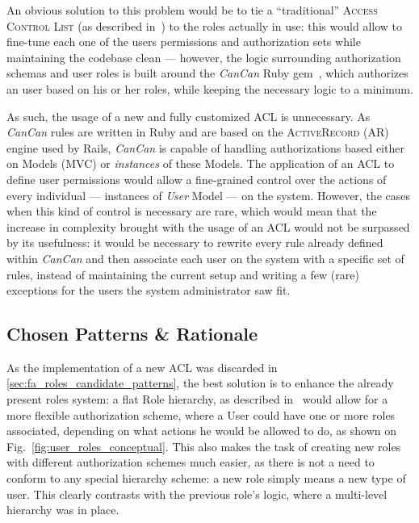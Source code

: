 An obvious solution to this problem would be to tie a ``traditional'' \textsc{Access Control List} (as described in~\cite{acls}) to the roles actually in use: this would allow to fine-tune each one of the users permissions and authorization sets while maintaining the codebase clean --- however, the logic surrounding authorization schemas and user roles is built around the \emph{CanCan} Ruby gem~\cite{cancan}, which authorizes an user based on his or her roles, while keeping the necessary logic to a minimum.

As such, the usage of a new and fully customized ACL is unnecessary. As \emph{CanCan} rules are written in Ruby and are based on the \textsc{ActiveRecord} (AR) engine used by Rails, \emph{CanCan} is capable of handling authorizations based either on Models (MVC) or \emph{instances} of these Models. The application of an ACL to define user permissions would allow a fine-grained control over the actions of every individual --- instances of \emph{User} Model --- on the system. However, the cases when this kind of control is necessary are rare, which would mean that the increase in complexity brought with the usage of an ACL would not be surpassed by its usefulness: it would be necessary to rewrite every rule already defined within \emph{CanCan} and then associate each user on the system with a specific set of rules, instead of maintaining the current setup and writing a few (rare) exceptions for the users the system administrator saw fit.

\subsection{Chosen Patterns \& Rationale}\label{sec:fa_roles_chosen_patterns_rationale}

As the implementation of a new ACL was discarded in \ref{sec:fa_roles_candidate_patterns}, the best solution is to enhance the already present roles system: a flat Role hierarchy, as described in~\cite{baumer_riehle_role_object} would allow for a more flexible authorization scheme, where a User could have one or more roles associated, depending on what actions he would be allowed to do, as shown on Fig.~\ref{fig:user_roles_conceptual}. This also makes the task of creating new roles with different authorization schemes much easier, as there is not a need to conform to any special hierarchy scheme: a new role simply means a new type of user. This clearly contrasts with the previous role's logic, where a multi-level hierarchy was in place.

